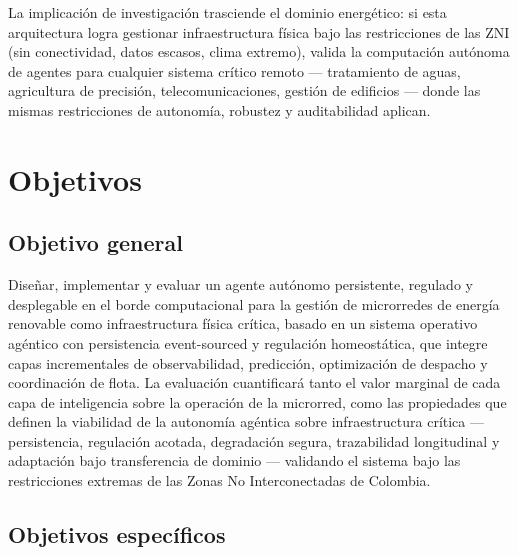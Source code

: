 \documentclass[12pt,letterpaper]{article}
\begin{document}
La implicaci\'on de investigaci\'on trasciende el dominio energ\'etico: si esta arquitectura logra gestionar infraestructura f\'isica bajo las restricciones de las ZNI (sin conectividad, datos escasos, clima extremo), valida la computaci\'on aut\'onoma de agentes para cualquier sistema cr\'itico remoto --- tratamiento de aguas, agricultura de precisi\'on, telecomunicaciones, gesti\'on de edificios --- donde las mismas restricciones de autonom\'ia, robustez y auditabilidad aplican.

\section{Objetivos}

\subsection{Objetivo general}

Dise\~nar, implementar y evaluar un agente aut\'onomo persistente, regulado y desplegable en el borde computacional para la gesti\'on de microrredes de energ\'ia renovable como infraestructura f\'isica cr\'itica, basado en un sistema operativo ag\'entico con persistencia event-sourced y regulaci\'on homeost\'atica, que integre capas incrementales de observabilidad, predicci\'on, optimizaci\'on de despacho y coordinaci\'on de flota. La evaluaci\'on cuantificar\'a tanto el valor marginal de cada capa de inteligencia sobre la operaci\'on de la microrred, como las propiedades que definen la viabilidad de la autonom\'ia ag\'entica sobre infraestructura cr\'itica --- persistencia, regulaci\'on acotada, degradaci\'on segura, trazabilidad longitudinal y adaptaci\'on bajo transferencia de dominio --- validando el sistema bajo las restricciones extremas de las Zonas No Interconectadas de Colombia.

\subsection{Objetivos espec\'ificos}
\end{document}
